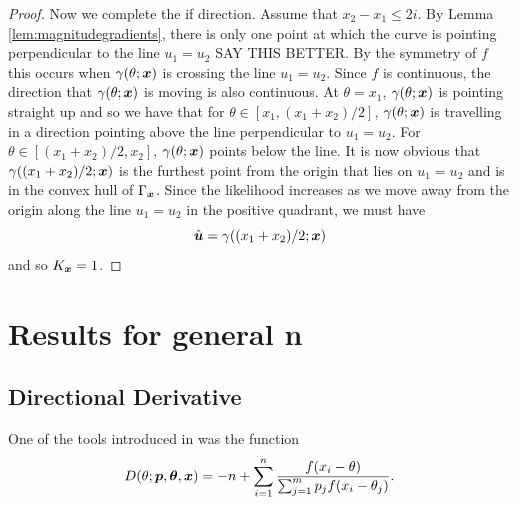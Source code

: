 \begin{proof}
			Now we complete the if direction. Assume that $x_2 - x_1 \leq 2i$. By Lemma \ref{lem:magnitudegradients}, there is only one point at which the curve is pointing perpendicular to the line $u_1 = u_2$ SAY THIS BETTER. By the symmetry of $f$ this occurs when $\gamma(\theta;{\bm{{x}}})$ is crossing the line $u_1 = u_2$. Since $f$ is continuous, the direction that $\gamma(\theta;{\bm{{x}}})$ is moving is also continuous. At $\theta = x_1$, $\gamma(\theta;{\bm{{x}}})$ is pointing straight up and so we have that for $\theta \in [x_1,(x_1 + x_2)/2]$, $\gamma(\theta;{\bm{{x}}})$ is travelling in a direction pointing above the line perpendicular to $u_1 = u_2$. For $\theta \in [(x_1 + x_2)/2,x_2]$, $\gamma(\theta;{\bm{{x}}})$ points below the line. It is now obvious that $\gamma((x_1 + x_2)/2;{\bm{{x}}})$ is the furthest point from the origin that lies on $u_1 = u_2$ and is in the convex hull of $\Gamma_{\bm{{x}}}$. Since the likelihood increases as we move away from the origin along the line $u_1 = u_2$ in the positive quadrant, we must have
			$$\hat{{\bm{{u}}}} = \gamma((x_1 + x_2)/2;{\bm{{x}}})$$
			and so $K_{\bm{{x}}} = 1$.
			
		\end{proof}

\section{Results for general n}
	\subsection{Directional Derivative}
		One of the tools introduced in \cite{Lindsay1983-tf} was the function
		\begin{equation}
			D(\theta;{\bm{{p}}},{\bm{{\theta}}},{\bm{{x}}}) = -n + \sum_{i=1}^n \frac{f(x_i - \theta)}{\sum_{j=1}^m p_j f(x_i - \theta_j)}.
		\end{equation}

